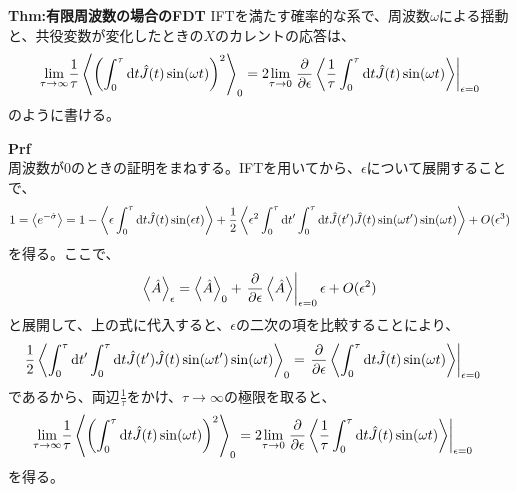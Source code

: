 \documentclass[a4paper,11pt]{jsarticle}
\begin{document}
\begin{itembox}[l]{\textbf{Thm:有限周波数の場合のFDT}}
    IFTを満たす確率的な系で、周波数$\omega$による揺動と、共役変数が変化したときの$X$のカレントの応答は、
    \begin{equation}
        \underset{\tau \to \infty}{\text{lim}}\frac{1}{\tau} \ev{\left(\int_{0}^{\tau} \dd t \hat{J}(t)\sin(\omega t)\right)^2}_0 = 2\underset{\tau \to 0}{\text{lim}} \left. \pdv{\epsilon} \ev{\frac{1}{\tau} \int_{0}^{\tau} \dd t \hat{J}(t)\sin(\omega t)}\right|_{\epsilon = 0}
    \end{equation}
    のように書ける。
\end{itembox}
\textbf{Prf}\\
周波数が0のときの証明をまねする。IFTを用いてから、$\epsilon$について展開することで、
\begin{align}
    1=\ev{e^{-\hat{\sigma}}}&=1-\ev{\epsilon \int_{0}^{\tau} \dd t \hat{J}(t) \sin(\epsilon t)} + \frac{1}{2}\ev{\epsilon^2 \int_{0}^{\tau} \dd t' \int_{0}^{\tau} \dd t \hat{J}(t')\hat{J}(t) \sin(\omega t')\sin(\omega t)} + O(\epsilon^3)\\
\end{align}
を得る。ここで、
\begin{equation}
    \ev{\hat{A}}_{\epsilon} = \ev{\hat{A}}_0 + \left. \pdv{\epsilon} \ev{\hat{A}}\right| _{\epsilon = 0} \epsilon + O(\epsilon^2)
\end{equation}
と展開して、上の式に代入すると、$\epsilon$の二次の項を比較することにより、
\begin{align}
    \frac{1}{2}\ev{\int_{0}^{\tau} \dd t' \int_{0}^{\tau} \dd t \hat{J}(t')\hat{J}(t) \sin(\omega t')\sin(\omega t)}_0 &= \left. \pdv{\epsilon} \ev{\int_{0}^{\tau} \dd t \hat{J}(t) \sin(\omega t)}\right|_{\epsilon = 0}
\end{align}
であるから、両辺$\frac{1}{\tau}$をかけ、$\tau \to \infty$の極限を取ると、
\begin{align}
    \underset{\tau \to \infty}{\text{lim}}\frac{1}{\tau} \ev{\left(\int_{0}^{\tau} \dd t \hat{J}(t)\sin(\omega t)\right)^2}_0 &= 2\underset{\tau \to 0}{\text{lim}} \left. \pdv{\epsilon} \ev{\frac{1}{\tau} \int_{0}^{\tau} \dd t \hat{J}(t)\sin(\omega t)}\right|_{\epsilon = 0}
\end{align}
を得る。\hfill \qedsymbol
\end{document}
